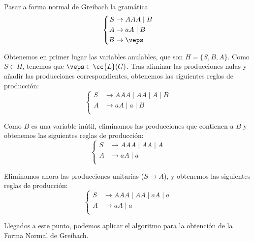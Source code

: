 \begin{ejercicio}\label{ej:1.4.12}
    Pasar a forma normal de Greibach la gramática
    \begin{equation*}
        \left\{
            \begin{aligned}
                S &\rightarrow AAA \mid B\\
                A &\rightarrow aA \mid B\\
                B &\rightarrow \veps
            \end{aligned}
        \right.
    \end{equation*}

    Obtenemos en primer lugar las variables anulables, que son $H=\{S,B,A\}$. Como $S\in H$, tenemos que $\veps\in \cc{L}(G)$.
    Tras aliminar las producciones nulas y añadir las producciones correspondientes, obtenemos las siguientes reglas de producción:
    \begin{equation*}
        \left\{
            \begin{aligned}
                S &\rightarrow AAA \mid AA\mid A \mid B\\
                A &\rightarrow aA \mid a\mid B\\
            \end{aligned}
        \right.
    \end{equation*}

    Como $B$ es una variable inútil, eliminamos las producciones que contienen a $B$ y obtenemos las siguientes reglas de producción:
    \begin{equation*}
        \left\{
            \begin{aligned}
                S &\rightarrow AAA \mid AA\mid A\\
                A &\rightarrow aA \mid a\\
            \end{aligned}
        \right.
    \end{equation*}


    Eliminamos ahora las producciones unitarias ($S\rightarrow A$), y obtenemos las siguientes reglas de producción:
    \begin{equation*}
        \left\{
            \begin{aligned}
                S &\rightarrow AAA \mid AA\mid aA\mid a\\
                A &\rightarrow aA \mid a\\
            \end{aligned}
        \right.
    \end{equation*}

    Llegados a este punto, podemos aplicar el algoritmo para la obtención de la Forma Normal de Greibach.
\end{ejercicio}


